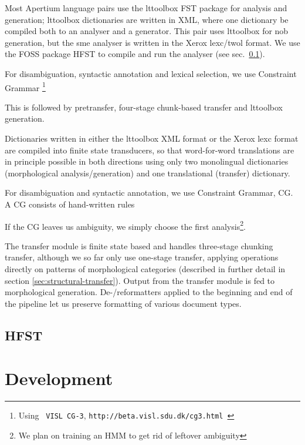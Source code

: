 Most Apertium language pairs use the lttoolbox FST package for
analysis and generation; lttoolbox dictionaries are written in XML,
where one dictionary be compiled both to an analyser and a generator.
This pair uses lttoolbox for nob generation, but the sme analyser is
written in the Xerox lexc/twol format\citep{beesley2003fsm}. We use
the FOSS package HFST to compile and run the analyser
(see sec.~\ref{sec:hfst}).

For disambiguation, syntactic annotation and lexical selection, we use
Constraint Grammar \citep{karlsson1990cgf}\footnote{Using {\tt \small
    VISL CG-3}, \tt{http://beta.visl.sdu.dk/cg3.html} }

This is followed by
pretransfer, four-stage chunk-based transfer and lttoolbox generation.



Dictionaries written in either the lttoolbox XML format or the Xerox
lexc format are compiled into finite state transducers, so that
word-for-word translations are in principle possible in both
directions using only two monolingual dictionaries (morphological
analysis/generation) and one translational (transfer) dictionary.



For disambiguation and syntactic annotation, we use Constraint
Grammar, CG. A CG
\citep{karlsson1990cgf} consists of hand-written rules 

If the CG leaves us ambiguity, we simply choose the first
analysis\footnote{We plan on training an HMM to get rid of leftover
  ambiguity}.


The transfer module is finite state based and handles three-stage
chunking transfer, although we so far only use one-stage transfer,
applying operations directly on patterns of morphological categories
(described in further detail in section
\ref{sec:structural-transfer}). Output from the transfer module is fed
to morphological generation. De-/reformatters applied to the beginning
and end of the pipeline let us preserve formatting of various document
types.

\subsection{HFST}
\label{sec:hfst}

\section{Development}

